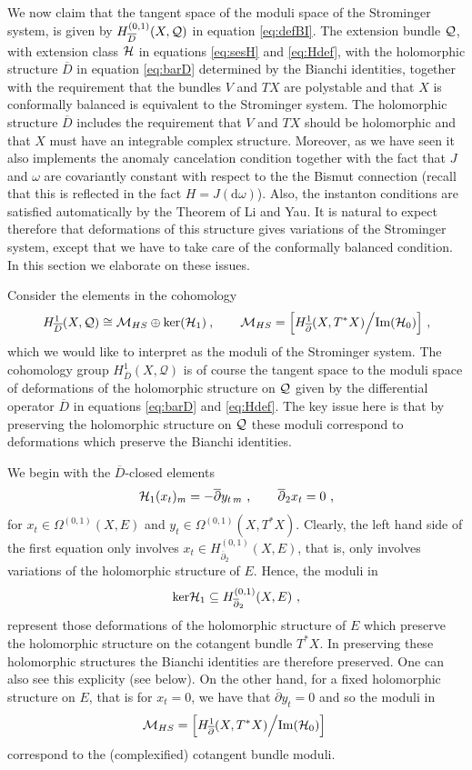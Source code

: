 \documentclass[12pt,a4paper]{article}
\def\bar#1{\overline{#1}}
\def\d{\textrm{d}}
\def\ker{\textrm{ker}}
\def\bp{\bar{\partial}}
\def\Q{\mathcal{Q}}
\theoremstyle{definition}
\begin{document}
We now claim that the tangent space of the moduli space of the Strominger system, is given by $H_{\bar D}^{(0,1)}(X,{\cal Q})$ in equation \eqref{eq:defBI}.   The extension bundle $\cal Q$, with extension class $\cal H$ in equations \eqref{eq:sesH} and \eqref{eq:Hdef},
with the holomorphic structure $\bar D$ in equation \eqref{eq:barD} determined by the Bianchi identities, together with the requirement that the bundles $V$ and $TX$ are polystable  and that $X$ is conformally balanced is equivalent to the Strominger system.  
The holomorphic structure $\bar D$ includes the requirement that $V$ and $TX$ should be holomorphic and that $X$ must have an integrable complex structure. Moreover, as we have seen it also implements the anomaly cancelation condition  together with the fact that $J$ and $\omega$ are covariantly constant with respect to the the Bismut connection (recall that this is reflected in the fact $ H = J(\d\omega)$).  Also, the instanton conditions are satisfied automatically by the Theorem of Li and Yau.  It is natural to expect therefore that deformations  of this structure gives variations of the Strominger system, except that we have to take care of the conformally balanced condition.  In this section we elaborate on these issues. 

Consider the elements in the cohomology
\begin{equation}
\label{eq:defMSS}
H_{\bar D}^1(X, \Q)\cong {\cal M}_{HS}\oplus\ker({\cal H}_1)\:,
\qquad  {\cal M}_{HS} = \Big[H_{\bp}^1(X,T^*X)\Big/\textrm{Im}({\cal H}_0)\Big]~,
\end{equation}
which we would like to interpret as the moduli of the Strominger system. 
The cohomology group  $H_{\bar D}^1(X, \Q)$ is of course the tangent space to the moduli space of deformations of the holomorphic structure on
$\cal Q$ given by the differential operator $\bar D$ in equations \eqref{eq:barD} and \eqref{eq:Hdef}.  The key issue here is that by preserving the holomorphic structure on $\cal Q$ these moduli correspond to deformations which preserve the Bianchi identities.


We begin with the $\bar D$-closed elements
\begin{equation}
 {\cal H}_1(x_t)_m = - \bp y_{t\, m}~,\qquad \bp_2 x_t = 0~,\label{eq:Dclosed}
\end{equation} 
for $x_t\in \Omega^{(0,1)}(X,E)$ and $y_t\in \Omega^{(0,1)}(X,T^*X)$. Clearly, the  left hand side of the first equation only involves $x_t\in H_{\bp_2}^{(0,1)}(X,E)$, that is, only involves variations of the holomorphic structure of $E$. Hence, the moduli in
\[ \ker{\cal H}_1\subseteq H_{\bp_2}^{(0,1)}(X,E)~,\]
represent those deformations of the holomorphic structure of $E$ which preserve the holomorphic structure on the cotangent bundle $T^*X$.
In preserving these holomorphic structures the Bianchi identities are therefore preserved.  One can also see this explicity (see below).
On the other hand, for a fixed holomorphic structure on $E$, that is for $x_t = 0$, we have that $\bp y_t = 0$ and so 
the moduli in 
\[{\cal M}_{HS}= \Big[H_{\bp}^1(X,T^*X)\Big/\textrm{Im}({\cal H}_0)\Big]~\]
correspond to the (complexified) cotangent bundle moduli.
\end{document}
